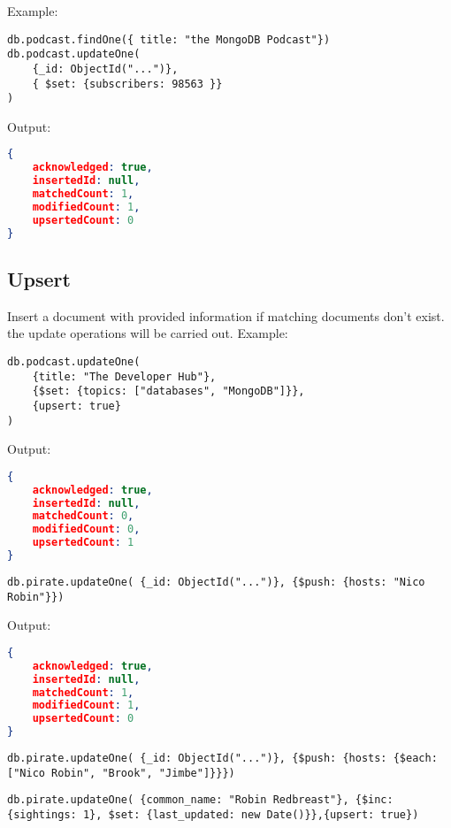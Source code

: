 \documentclass[../main.tex]{subfiles}
\begin{document}
Example: 
\begin{lstlisting}[language=MongoDB, caption=updateOne example]
db.podcast.findOne({ title: "the MongoDB Podcast"})
db.podcast.updateOne(
	{_id: ObjectId("...")},
	{ $set: {subscribers: 98563 }}
)
\end{lstlisting}

Output: 
\begin{lstlisting}[language=JSON, caption=updateOne example output]
{
	acknowledged: true, 
	insertedId: null, 
	matchedCount: 1, 
	modifiedCount: 1, 
	upsertedCount: 0
}
\end{lstlisting}

\subsection{Upsert}
Insert a document with provided information if matching documents don't exist.
the update operations will be carried out.
Example: 
\begin{lstlisting}[language=MongoDB, caption=updateOne upsert example]
db.podcast.updateOne(
	{title: "The Developer Hub"},
	{$set: {topics: ["databases", "MongoDB"]}},
	{upsert: true}
)
\end{lstlisting}

Output: 
\begin{lstlisting}[language=JSON, caption=updateOne upsert example output]
{
	acknowledged: true, 
	insertedId: null, 
	matchedCount: 0, 
	modifiedCount: 0, 
	upsertedCount: 1
}
\end{lstlisting}


\begin{lstlisting}[language=MongoDB, caption=updateOne push example]
db.pirate.updateOne( {_id: ObjectId("...")}, {$push: {hosts: "Nico Robin"}})
\end{lstlisting}
Output: 
\begin{lstlisting}[language=JSON, caption=updateOne upsert push output]
{
	acknowledged: true, 
	insertedId: null, 
	matchedCount: 1, 
	modifiedCount: 1, 
	upsertedCount: 0
}
\end{lstlisting}

\begin{lstlisting}[language=MongoDB, caption=updateOne push each example]
db.pirate.updateOne( {_id: ObjectId("...")}, {$push: {hosts: {$each: ["Nico Robin", "Brook", "Jimbe"]}}})
\end{lstlisting}

\begin{lstlisting}[language=MongoDB, caption=updateOne inc example]
db.pirate.updateOne( {common_name: "Robin Redbreast"}, {$inc: {sightings: 1}, $set: {last_updated: new Date()}},{upsert: true})
\end{lstlisting}
\end{document}
